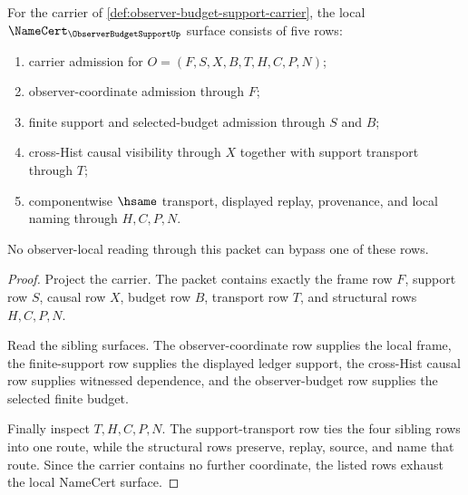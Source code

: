 \begin{theorem}
\label{thm:observer-budget-support-namecert-obligations}
For the carrier of \autoref{def:observer-budget-support-carrier}, the local $\NameCert_{\ObserverBudgetSupportUp}$ surface consists of five rows:
\begin{enumerate}
\item carrier admission for $O=(F,S,X,B,T,H,C,P,N)$;
\item observer-coordinate admission through $F$;
\item finite support and selected-budget admission through $S$ and $B$;
\item cross-Hist causal visibility through $X$ together with support transport through $T$;
\item componentwise $\hsame$ transport, displayed replay, provenance, and local naming through $H,C,P,N$.
\end{enumerate}
No observer-local reading through this packet can bypass one of these rows.
\end{theorem}
\begin{proof}
Project the carrier. The packet contains exactly the frame row $F$, support row $S$, causal row $X$, budget row $B$, transport row $T$, and structural rows $H,C,P,N$.

Read the sibling surfaces. The observer-coordinate row supplies the local frame, the finite-support row supplies the displayed ledger support, the cross-Hist causal row supplies witnessed dependence, and the observer-budget row supplies the selected finite budget.

Finally inspect $T,H,C,P,N$. The support-transport row ties the four sibling rows into one route, while the structural rows preserve, replay, source, and name that route. Since the carrier contains no further coordinate, the listed rows exhaust the local NameCert surface.
\end{proof}

